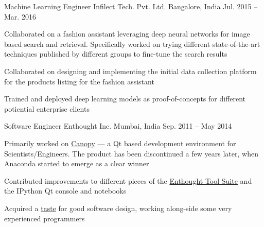 \begin{cventries}
  \cventry
    {Machine Learning Engineer} %
    {Infilect Tech. Pvt. Ltd. } %
    {Bangalore, India} %
    {Jul. 2015 -- Mar. 2016} %
    {
      \begin{cvitems} %
        \item{Collaborated on a fashion assistant leveraging deep neural networks for image based search and retrieval. Specifically worked on trying different state-of-the-art techniques published by different groups to fine-tune the search results}
        \item{Collaborated on designing and implementing the initial data collection platform for the products listing for the fashion assistant}
        \item{Trained and deployed deep learning models as proof-of-concepts for different potiential enterprise clients}
      \end{cvitems}
    }

  \cventry
    {Software Engineer} %
    {Enthought Inc. } %
    {Mumbai, India} %
    {Sep. 2011 -- May 2014} %
    {
      \begin{cvitems} %
        \item {Primarily worked on \href{https://web.archive.org/web/20170621202502/https://www.enthought.com/products/canopy/}{Canopy} --- a Qt based development environment for Scientists/Engineers. The product has been discontinued a few years later, when Anaconda started to emerge as a clear winner}
        \item {Contributed improvements to different pieces of the \href{https://docs.enthought.com/ets/}{Enthought Tool Suite} and the IPython Qt console and notebooks}
        \item {Acquired a \href{https://rawgit.com/punchagan/340e1350fdfc766c6599/raw/ca1f5fe9bfc1cc503cd8a524e350bd29e8f5f33d/month-with-martin.html}{taste} for good software design, working along-side some very experienced programmers}
      \end{cvitems}
    }


\end{cventries}
